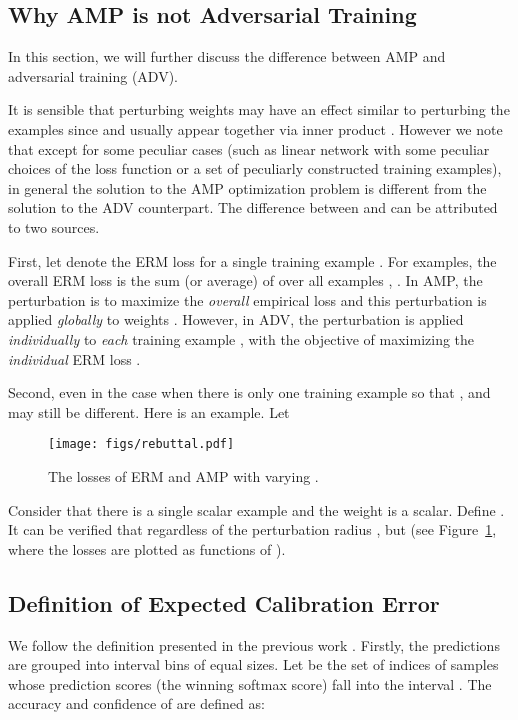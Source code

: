 \documentclass[final]{cvpr}
\begin{document}
\subsection{Why AMP is not Adversarial Training}\label{app:c}

In this section, we will further discuss the difference between AMP and adversarial training (ADV).

It is sensible that perturbing weights  may have an effect similar to perturbing the examples  since  and  usually appear together via inner product . However we note that except for some peculiar cases (such as linear network with some peculiar choices of the loss function or a set of peculiarly constructed training examples), in general the solution  to the AMP optimization problem is different from the solution  to the ADV counterpart. The difference between  and  can be attributed to two sources. 

First, let  denote the ERM loss for a single training example . For  examples, the overall ERM loss  is the sum (or average) of  over all examples , . In AMP, the perturbation is to maximize the {\em overall} empirical loss  and this perturbation is applied {\em globally} to weights . However, in ADV, the perturbation is applied {\em individually} to {\em each} training example , with the objective of maximizing the {\em individual} ERM loss .

Second, even in the case when there is only one training example  so that ,  and  may still be different. Here is an example. Let 


\begin{figure}[t]
\centering
\texttt{[image: figs/rebuttal.pdf]}
\caption{The losses of ERM and AMP with varying .}
\label{fig:diff}
\end{figure}

Consider that there is a single scalar example  and  the weight  is a scalar. Define .  It can be verified that  regardless of the perturbation radius , but  (see Figure~\ref{fig:diff}, where the losses are plotted as functions of ).

\subsection{Definition of Expected Calibration Error}\label{app:d}

We follow the definition presented in the previous work \cite{guo2017calibration}. Firstly, the predictions are grouped into  interval bins of equal sizes. Let  be the set of indices of samples whose prediction scores (the winning softmax score) fall into the interval . The accuracy and confidence of  are defined as:
\end{document}
